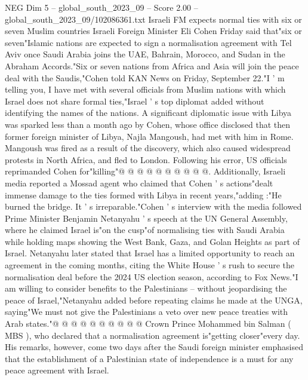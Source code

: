 \begin{textsample}{NEG Dim 5 – global\_south\_2023\_09 – Score 2.00 – global\_south\_2023\_09/102086361.txt}  \label{ex:f5_neg_005}
Israeli FM expects normal ties with six or seven Muslim countries Israeli Foreign Minister Eli Cohen Friday said that"six or seven"Islamic nations are expected to sign a normalisation agreement with Tel Aviv once Saudi Arabia joins the UAE, Bahrain, Morocco, and Sudan in the Abraham Accords."Six or seven nations from Africa and Asia will join the peace deal with the Saudis,"Cohen told KAN News on Friday, September 22."I ' m telling you, I have met with several officials from Muslim nations with which Israel does not share formal ties,"Israel ' s top diplomat added without identifying the names of the nations.
A significant diplomatic issue with Libya was sparked less than a month ago by Cohen, whose office disclosed that then former foreign minister of Libya, Najla Mangoush, had met with him in Rome.
Mangoush was fired as a result of the discovery, which also caused widespread protests in North Africa, and fled to London.
Following his error, US officials reprimanded Cohen for"killing"@ @ @ @ @ @ @ @ @ @.
Additionally, Israeli media reported a Mossad agent who claimed that Cohen ' s actions"dealt immense damage to the ties formed with Libya in recent years,"adding :"He burned the bridge.
It ' s irreparable."Cohen ' s interview with the media followed Prime Minister Benjamin Netanyahu ' s speech at the UN General Assembly, where he claimed Israel is"on the cusp"of normalising ties with Saudi Arabia while holding maps showing the West Bank, Gaza, and Golan Heights as part of Israel.
Netanyahu later stated that Israel has a limited opportunity to reach an agreement in the coming months, citing the White House ' s rush to secure the normalisation deal before the 2024 US election season, according to Fox News."I am willing to consider benefits to the Palestinians -- without jeopardising the peace of Israel,"Netanyahu added before repeating claims he made at the UNGA, saying"We must not give the Palestinians a veto over new peace treaties with Arab states."@ @ @ @ @ @ @ @ @ @ Crown Prince Mohammed bin Salman ( MBS ), who declared that a normalisation agreement is"getting closer"every day.
His remarks, however, come two days after the Saudi foreign minister emphasised that the establishment of a Palestinian state of independence is a must for any peace agreement with Israel.

\end{textsample}
